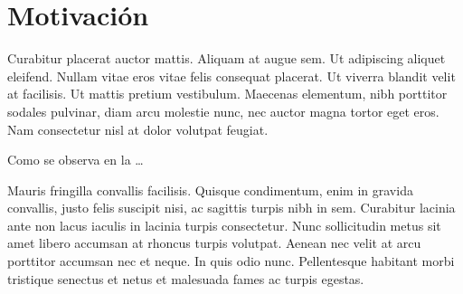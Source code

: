 
\section{Motivación}
\label{sec:motivacion}

Curabitur placerat auctor mattis. Aliquam at augue sem. Ut adipiscing aliquet
eleifend. Nullam vitae eros vitae felis consequat placerat. Ut viverra blandit
velit at facilisis. Ut mattis pretium vestibulum. Maecenas elementum, nibh
porttitor sodales pulvinar, diam arcu molestie nunc, nec auctor magna tortor
eget eros. Nam consectetur nisl at dolor volutpat feugiat. 

Como se observa en la  \ldots


Mauris fringilla convallis facilisis. Quisque condimentum, enim in gravida
convallis, justo felis suscipit nisi, ac sagittis turpis nibh in sem. Curabitur
lacinia ante non lacus iaculis in lacinia turpis consectetur. Nunc sollicitudin
metus sit amet libero accumsan at rhoncus turpis volutpat. Aenean nec velit at
arcu porttitor accumsan nec et neque. In quis odio nunc. Pellentesque habitant
morbi tristique senectus et netus et malesuada fames ac turpis egestas.